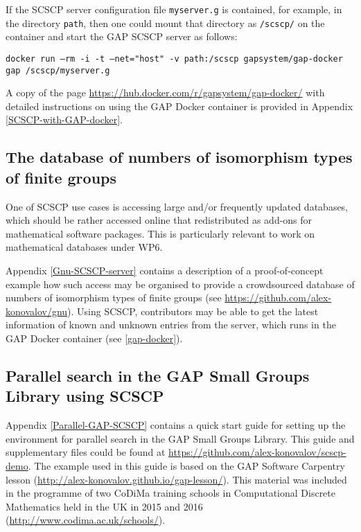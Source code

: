 \documentclass{deliverablereport}
\begin{document}
If the SCSCP server configuration file {\tt myserver.g} is 
contained, for example, in the directory {\tt path}, 
then one could mount that directory as {\tt /scscp/} on the
container and start the GAP SCSCP server as follows:

{\tiny{\tt docker run --rm -i -t --net="host" -v path:/scscp gapsystem/gap-docker gap /scscp/myserver.g}}

A copy of the page \url{https://hub.docker.com/r/gapsystem/gap-docker/}
with detailed instructions on using the GAP Docker container 
is provided in Appendix \ref{SCSCP-with-GAP-docker}.


\subsection{The database of numbers of isomorphism
types of finite groups}\label{gnu-reproducibility}

One of SCSCP use cases is accessing large and/or frequently updated
databases, which should be rather accessed online that redistributed as
add-ons for mathematical software packages. 
This is particularly relevant to work on mathematical databases under WP6.

Appendix \ref{Gnu-SCSCP-server}
contains a description of a proof-of-concept example how such access may
be organised to provide a crowdsourced database of numbers of isomorphism
types of finite groups (see  \url{https://github.com/alex-konovalov/gnu}). 
Using SCSCP, contributors may be able to get the latest information of 
known and unknown entries from the server, which runs in the GAP Docker 
container (see \ref{gap-docker}).


\subsection{Parallel search in the GAP Small Groups Library using SCSCP}

Appendix \ref{Parallel-GAP-SCSCP} contains a quick start guide for setting
up the environment for parallel search in the GAP Small Groups Library. This
guide and supplementary files could be found at
\url{https://github.com/alex-konovalov/scscp-demo}.
The example used in this guide is based on the GAP Software Carpentry
lesson (\url{http://alex-konovalov.github.io/gap-lesson/}). This material was
included in the programme of two CoDiMa training schools in Computational
Discrete Mathematics held in the UK in 2015 and 2016
(\url{http://www.codima.ac.uk/schools/}).
\end{document}
